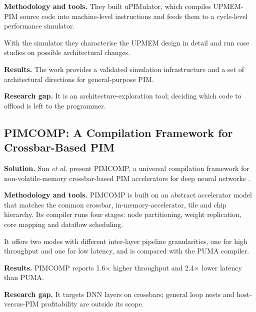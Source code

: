 \documentclass{ieeeaccess}
\begin{document}
\textbf{Methodology and tools.} They built uPIMulator, which compiles UPMEM-PIM source code into machine-level instructions and feeds them to a cycle-level performance simulator.

With the simulator they characterise the UPMEM design in detail and run case studies on possible architectural changes.

\textbf{Results.} The work provides a validated simulation infrastructure and a set of architectural directions for general-purpose PIM.

\textbf{Research gap.} It is an architecture-exploration tool; deciding which code to offload is left to the programmer.

\subsection{PIMCOMP: A Compilation Framework for Crossbar-Based PIM}
\textbf{Solution.} Sun \emph{et al.} present PIMCOMP, a universal compilation framework for non-volatile-memory crossbar-based PIM accelerators for deep neural networks \cite{sun2023pimcomp}.

\textbf{Methodology and tools.} PIMCOMP is built on an abstract accelerator model that matches the common crossbar, in-memory-accelerator, tile and chip hierarchy. Its compiler runs four stages: node partitioning, weight replication, core mapping and dataflow scheduling.

It offers two modes with different inter-layer pipeline granularities, one for high throughput and one for low latency, and is compared with the PUMA compiler.

\textbf{Results.} PIMCOMP reports 1.6$\times$ higher throughput and 2.4$\times$ lower latency than PUMA.

\textbf{Research gap.} It targets DNN layers on crossbars; general loop nests and host-versus-PIM profitability are outside its scope.
\end{document}

